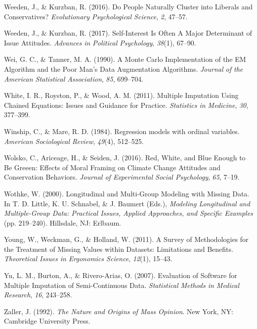 \documentclass[12pt,econ]{sources/authesis}
\begin{document}
\leavevmode\hypertarget{ref-weeden_2016_people}{}%
Weeden, J., \& Kurzban, R. (2016). Do People Naturally Cluster into Liberals and Conservatives? \emph{Evolutionary Psychological Science}, \emph{2}, 47--57.

\leavevmode\hypertarget{ref-weeden_2017_self-interest}{}%
Weeden, J., \& Kurzban, R. (2017). Self-Interest Is Often A Major Determinant of Issue Attitudes. \emph{Advances in Political Psychology}, \emph{38}(1), 67--90.

\leavevmode\hypertarget{ref-wei_1990_monte}{}%
Wei, G. C., \& Tanner, M. A. (1990). A Monte Carlo Implementation of the EM Algorithm and the Poor Man's Data Augmentation Algorithms. \emph{Journal of the American Statistical Association}, \emph{85}, 699--704.

\leavevmode\hypertarget{ref-white_2011_multiple}{}%
White, I. R., Royston, P., \& Wood, A. M. (2011). Multiple Imputation Using Chained Equations: Issues and Guidance for Practice. \emph{Statistics in Medicine}, \emph{30}, 377--399.

\leavevmode\hypertarget{ref-winship_1984_regression}{}%
Winship, C., \& Mare, R. D. (1984). Regression models with ordinal variables. \emph{American Sociological Review}, \emph{49}(4), 512--525.

\leavevmode\hypertarget{ref-wolsko_2016_white}{}%
Wolsko, C., Ariceage, H., \& Seiden, J. (2016). Red, White, and Blue Enough to Be Greeen: Effects of Moral Framing on Climate Change Attitudes and Conservation Behaviors. \emph{Journal of Experimental Social Psychology}, \emph{65}, 7--19.

\leavevmode\hypertarget{ref-wothke_2000_longitudinal}{}%
Wothke, W. (2000). Longitudinal and Multi-Group Modeling with Missing Data. In T. D. Little, K. U. Schnabel, \& J. Baumert (Eds.), \emph{Modeling Longitudinal and Multiple-Group Data: Practical Issues, Applied Approaches, and Specific Examples} (pp. 219--240). Hillsdale, NJ: Erlbaum.

\leavevmode\hypertarget{ref-young_2011_survey}{}%
Young, W., Weckman, G., \& Holland, W. (2011). A Survey of Methodologies for the Treatment of Missing Values within Datasets: Limitations and Benefits. \emph{Theoretical Issues in Ergonomics Science}, \emph{12}(1), 15--43.

\leavevmode\hypertarget{ref-yu_2007_evaluation}{}%
Yu, L. M., Burton, A., \& Rivero-Arias, O. (2007). Evaluation of Software for Multiple Imputation of Semi-Continuous Data. \emph{Statistical Methods in Medical Research}, \emph{16}, 243--258.

\leavevmode\hypertarget{ref-zaller_nature_1992}{}%
Zaller, J. (1992). \emph{The Nature and Origins of Mass Opinion}. New York, NY: Cambridge University Press.
\end{document}
